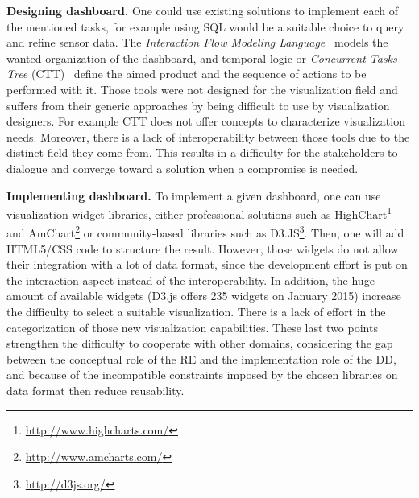 \documentclass{sigplanconf}
\begin{document}
\textbf{Designing dashboard.}
One could use existing solutions to implement each of the mentioned
tasks, for example using SQL would be a suitable choice to query and
refine sensor data. The \emph{Interaction Flow Modeling
  Language}~\cite{ifml} models the wanted organization of the
dashboard, and temporal logic or \emph{Concurrent Tasks Tree}
(CTT)~\cite{ctt} define the aimed product and the sequence of actions
to be performed with it.
Those tools were not designed for the visualization field and suffers
from their generic approaches by being difficult to use by
visualization designers. For example CTT does not offer concepts to
characterize visualization needs.
Moreover, there is a lack of interoperability between those tools due
to the distinct field they come from. This results in a difficulty for
the stakeholders to dialogue and converge toward a solution when a
compromise is needed.

\textbf{Implementing dashboard.}
To implement a given dashboard, one can use visualization widget
libraries, either professional solutions such as
HighChart\footnote{\url{http://www.highcharts.com/}} and
AmChart\footnote{\url{http://www.amcharts.com/}} or com\-munity-based
libraries such as D3.JS\footnote{\url{http://d3js.org/}}. Then, one
will add HTML5/CSS code to structure the result.
However, those widgets do not allow their integration with a lot of
data format, since the development effort is put on the interaction
aspect instead of the interoperability. In addition, the huge amount
of available widgets (\eg D3.js offers 235 widgets on January 2015)
increase the difficulty to select a suitable visualization. There is 
a lack of effort in the categorization of those new visualization
capabilities\cite{ecmfa}.  These last two points strengthen the
difficulty to cooperate with other domains, considering the gap
between the conceptual role of the RE and the implementation role of
the DD, and because of the incompatible constraints imposed by the chosen
libraries on data format then reduce reusability.
\end{document}
